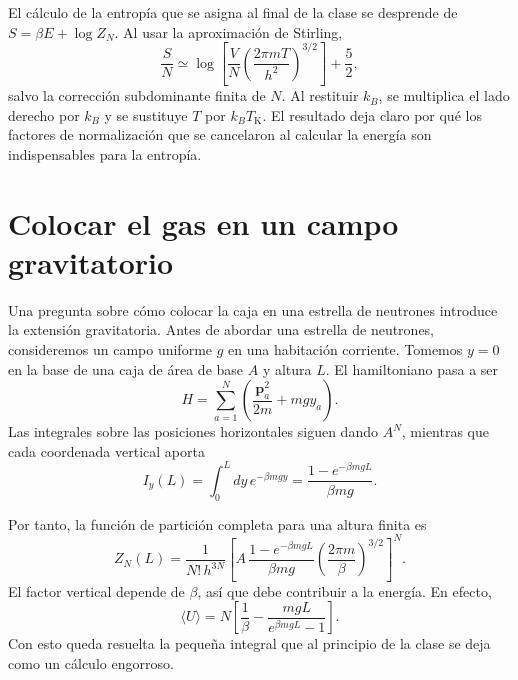 El cálculo de la entropía que se asigna al final de la clase se desprende de \(S=\beta E+\log Z_N\). Al usar la aproximación de Stirling,
\begin{equation}
 \frac{S}{N}
 \simeq
 \log\!\left[
  \frac{V}{N}
  \left(\frac{2\pi mT}{h^2}\right)^{3/2}
 \right]
 +\frac{5}{2},
 \label{eq:sm4-sackur-tetrode}
\end{equation}
salvo la corrección subdominante finita de \(N\). Al restituir \(k_B\), se multiplica el lado derecho por \(k_B\) y se sustituye \(T\) por \(k_BT_{\mathrm K}\). El resultado deja claro por qué los factores de normalización que se cancelaron al calcular la energía son indispensables para la entropía.

\section{Colocar el gas en un campo gravitatorio}

Una pregunta sobre cómo colocar la caja en una estrella de neutrones introduce la extensión gravitatoria. Antes de abordar una estrella de neutrones, consideremos un campo uniforme \(g\) en una habitación corriente. Tomemos \(y=0\) en la base de una caja de área de base \(A\) y altura \(L\). El hamiltoniano pasa a ser
\begin{equation}
 H=\sum_{a=1}^{N}
 \left(\frac{\bm p_a^2}{2m}+mgy_a\right).
 \label{eq:sm4-gravity-hamiltonian}
\end{equation}
Las integrales sobre las posiciones horizontales siguen dando \(A^N\), mientras que cada coordenada vertical aporta
\begin{equation}
 I_y(L)
 =\int_0^Ldy\,e^{-\beta mgy}
 =\frac{1-e^{-\beta mgL}}{\beta mg}.
 \label{eq:sm4-finite-height-integral}
\end{equation}

\begin{classroomqa}\end{classroomqa}

Por tanto, la función de partición completa para una altura finita es
\begin{equation}
 Z_N(L)
 =
 \frac{1}{N!\,h^{3N}}
 \left[
  A\,
  \frac{1-e^{-\beta mgL}}{\beta mg}
  \left(\frac{2\pi m}{\beta}\right)^{3/2}
 \right]^N.
 \label{eq:sm4-gravity-partition-finite}
\end{equation}
El factor vertical depende de \(\beta\), así que debe contribuir a la energía. En efecto,
\begin{equation}
 \langle U\rangle
 =N\left[
  \frac{1}{\beta}
  -\frac{mgL}{e^{\beta mgL}-1}
 \right].
 \label{eq:sm4-finite-gravity-energy}
\end{equation}
Con esto queda resuelta la pequeña integral que al principio de la clase se deja como un cálculo engorroso.

